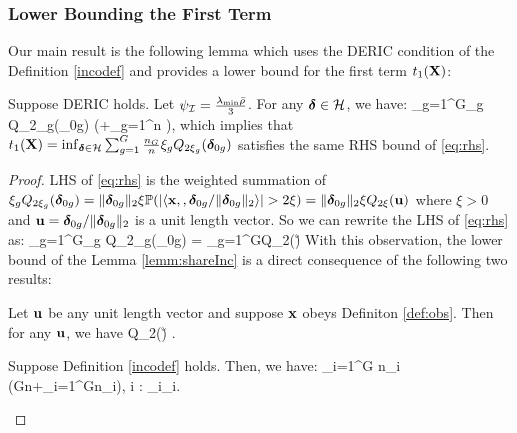 \subsubsection{Lower Bounding the First Term}
Our main result is the following lemma which uses the DERIC condition of the Definition \ref{incodef} and provides a lower bound for the first term $t_1(\mathbf{X})$:
\begin{lemma}
	\label{lemm:shareInc} 
	Suppose DERIC holds. Let $\psi_{{\cal{I}}}=\frac{\lambda_{\min}\bar{\rho}}{3}$. For any $\boldsymbol{\delta} \in {\cal H}$, we have: %
	\be 
	\label{eq:rhs}
	\sum_{g=1}^G\xi_g Q_{2\xi_g}(\ddelta_{0g}) \geq \rinc\xi {}\left(+\sum_{g=1}^n \right),
	\ee 	
	which implies that $t_1(\mathbf{X})=\inf_{\boldsymbol{\delta}\in {\cal H}} \sum_{g=1}^G\frac{n_G}{n}\xi_g Q_{2\xi_g}(\boldsymbol{\delta}_{0g})$ satisfies the same RHS bound of \eqref{eq:rhs}.
\end{lemma}
\begin{proof}
	LHS of \eqref{eq:rhs} is the weighted summation of $\xi_g Q_{2\xi_g}(\boldsymbol{\delta}_{0g}) = \|\boldsymbol{\delta}_{0g}\|_{2}\xi \mathbb{P}(|\langle \mathbf{x}, , \boldsymbol{\delta}_{0g}/\|\boldsymbol{\delta}_{0g}\|_{2} \rangle| > 2\xi) = \|\boldsymbol{\delta}_{0g}\|_{2}\xi Q_{2\xi}(\mathbf{u})$ where $\xi > 0$ and $\mathbf{u} = \boldsymbol{\delta}_{0g}/\|\boldsymbol{\delta}_{0g}\|_{2}$ is a unit length vector. 
	So we can rewrite the LHS of \eqref{eq:rhs} as:
	\be 
	\nr 
	\sum_{g=1}^G\xi_g Q_{2\xi_g}(\ddelta_{0g}) = \sum_{g=1}^G\xi Q_{2\xi}(\u)
	\ee 
	With this observation, the lower bound of the Lemma \ref{lemm:shareInc} is a direct consequence of the following two results: 
	\begin{lemma}\label{paley} Let $\mathbf{u}$ be any unit length vector and suppose $\mathbf{x}$ obeys Definiton \ref{def:obs}. Then for any $\mathbf{u}$, we have
		\be 
		Q_{2\xi}(\u) \geq {}.
		\ee 	
	\end{lemma}
	\begin{lemma} \label{incolem main} Suppose Definition \ref{incodef} holds. Then, we have: 
		\be 
		\sum_{i=1}^G n_i\geq{} \left(Gn+\sum_{i=1}^Gn_i\right), \quad \forall i \in [G]: \ddelta_i\in \cC_i.
		\ee 
	\end{lemma}	
\end{proof}

